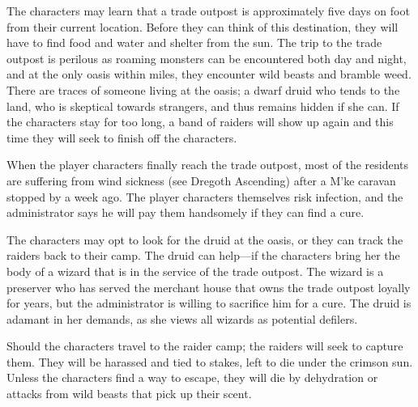 The characters may learn that a trade outpost is approximately five days on foot from their current location. Before they can think of this destination, they will have to find food and water and shelter from the sun. The trip to the trade outpost is perilous as roaming monsters can be encountered both day and night, and at the only oasis within miles, they encounter wild beasts and bramble weed. There are traces of someone living at the oasis; a dwarf druid who tends to the land, who is skeptical towards strangers, and thus remains hidden if she can. If the characters stay for too long, a band of raiders will show up again and this time they will seek to finish off the characters.

When the player characters finally reach the trade outpost, most of the residents are suffering from wind sickness (see Dregoth Ascending) after a M'ke caravan stopped by a week ago. The player characters themselves risk infection, and the administrator says he will pay them handsomely if they can find a cure.

The characters may opt to look for the druid at the oasis, or they can track the raiders back to their camp. The druid can help---if the characters bring her the body of a wizard that is in the service of the trade outpost. The wizard is a preserver who has served the merchant house that owns the trade outpost loyally for years, but the administrator is willing to sacrifice him for a cure. The druid is adamant in her demands, as she views all wizards as potential defilers.

Should the characters travel to the raider camp; the raiders will seek to capture them. They will be harassed and tied to stakes, left to die under the crimson sun. Unless the characters find a way to escape, they will die by dehydration or attacks from wild beasts that pick up their scent.